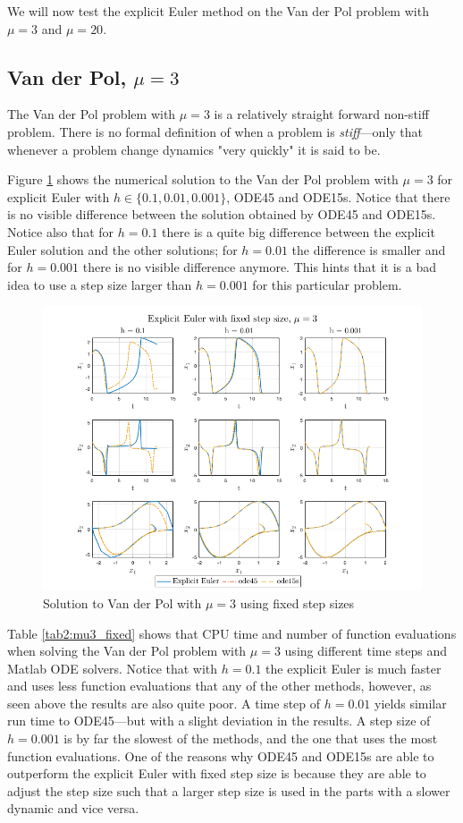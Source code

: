We will now test the explicit Euler method on the Van der Pol problem with $\mu = 3$ and $\mu = 20$. 

\subsection{Van der Pol, $\mu = 3$}
The Van der Pol problem with $\mu = 3$ is a relatively straight forward non-stiff problem. There is no formal definition of when a problem is \textit{stiff}---only that whenever a problem change dynamics "very quickly" it is said to be. 

Figure \ref{fig2:fixed_mu3} shows the numerical solution to the Van der Pol problem with $\mu = 3$ for explicit Euler with $h \in \{0.1, 0.01, 0.001\}$, ODE45 and ODE15s. Notice that there is no visible difference between the solution obtained by ODE45 and ODE15s. Notice also that for $h=0.1$ there is a quite big difference between the explicit Euler solution and the other solutions; for $h=0.01$ the difference is smaller and for $h=0.001$ there is no visible difference anymore. This hints that it is a bad idea to use a step size larger than $h=0.001$ for this particular problem.

\begin{figure}[H]
    \centering
    \includegraphics[width=\textwidth]{graphics/opg2/mu3_fixed.png}
    \caption{Solution to Van der Pol with $\mu = 3$ using fixed step sizes}
    \label{fig2:fixed_mu3}
\end{figure}

Table \ref{tab2:mu3_fixed} shows that CPU time and number of function evaluations when solving the Van der Pol problem with $\mu = 3$ using different time steps and Matlab ODE solvers. Notice that with $h=0.1$ the explicit Euler is much faster and uses less function evaluations that any of the other methods, however, as seen above the results are also quite poor. A time step of $h=0.01$ yields similar run time to ODE45---but with a slight deviation in the results. A step size of $h=0.001$ is by far the slowest of the methods, and the one that uses the most function evaluations. One of the reasons why ODE45 and ODE15s are able to outperform the explicit Euler with fixed step size is because they are able to adjust the step size such that a larger step size is used in the parts with a slower dynamic and vice versa. 

